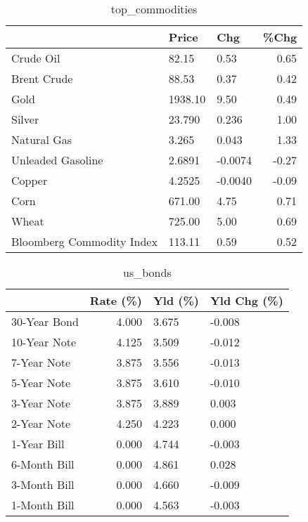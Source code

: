 \documentclass{article}%
\begin{document}
\begin{table}[htbp]%
\caption{top\_commodities}%
\centering%
\begin{adjustbox}{width=1\textwidth}%
\begin{tabular}{lllr}
\toprule
                          &   Price &     Chg &  \%Chg \\
\midrule
               Crude Oil  &   82.15 &    0.53 &  0.65 \\
             Brent Crude  &   88.53 &    0.37 &  0.42 \\
                    Gold  & 1938.10 &    9.50 &  0.49 \\
                  Silver  &  23.790 &   0.236 &  1.00 \\
             Natural Gas  &   3.265 &   0.043 &  1.33 \\
       Unleaded Gasoline  &  2.6891 & -0.0074 & -0.27 \\
                  Copper  &  4.2525 & -0.0040 & -0.09 \\
                    Corn  &  671.00 &    4.75 &  0.71 \\
                   Wheat  &  725.00 &    5.00 &  0.69 \\
Bloomberg Commodity Index &  113.11 &    0.59 &  0.52 \\
\bottomrule
\end{tabular}
%
\end{adjustbox}%
\end{table}

%


\begin{table}[htbp]%
\caption{us\_bonds}%
\centering%
\begin{adjustbox}{width=1\textwidth}%
\begin{tabular}{lrll}
\toprule
             &  Rate (\%) & Yld (\%) & Yld Chg (\%) \\
\midrule
30-Year Bond &     4.000 &   3.675 &      -0.008 \\
10-Year Note &     4.125 &   3.509 &      -0.012 \\
 7-Year Note &     3.875 &   3.556 &      -0.013 \\
 5-Year Note &     3.875 &   3.610 &      -0.010 \\
 3-Year Note &     3.875 &   3.889 &       0.003 \\
 2-Year Note &     4.250 &   4.223 &       0.000 \\
 1-Year Bill &     0.000 &   4.744 &      -0.003 \\
6-Month Bill &     0.000 &   4.861 &       0.028 \\
3-Month Bill &     0.000 &   4.660 &      -0.009 \\
1-Month Bill &     0.000 &   4.563 &      -0.003 \\
\bottomrule
\end{tabular}
%
\end{adjustbox}%
\end{table}
\end{document}
